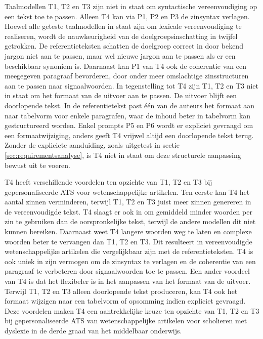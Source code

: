 Taalmodellen T1, T2 en T3 zijn niet in staat om syntactische vereenvoudiging op een tekst toe te passen. Alleen T4 kan via P1, P2 en P3 de zinsyntax verlagen. Hoewel alle geteste taalmodellen in staat zijn om lexicale vereenvoudiging te realiseren, wordt de nauwkeurigheid van de doelgroepsinschatting in twijfel getrokken. De referentieteksten schatten de doelgroep correct in door bekend jargon niet aan te passen, maar wel nieuwe jargon aan te passen als er een beschikbaar synoniem is.  Daarnaast kan P1 van T4 ook de coherentie van een meegegeven paragraaf bevorderen, door onder meer omslachtige zinsstructuren aan te passen naar signaalwoorden. In tegenstelling tot T4 zijn T1, T2 en T3 niet in staat om het formaat van de uitvoer aan te passen. De uitvoer blijft een doorlopende tekst. In de referentietekst past één van de auteurs het formaat aan naar tabelvorm voor enkele paragrafen, waar de inhoud beter in tabelvorm kan gestructureerd worden. Enkel prompts P5 en P6 wordt er expliciet gevraagd om een formaatwijziging, anders geeft T4 vrijwel altijd een doorlopende tekst terug. Zonder de expliciete aanduiding, zoals uitgetest in sectie \ref{sec:requirementsanalyse}, is T4 niet in staat om deze structurele aanpassing bewust uit te voeren. 

\medspace

T4 heeft verschillende voordelen ten opzichte van T1, T2 en T3 bij gepersonaliseerde ATS voor wetenschappelijke artikelen. Ten eerste kan T4 het aantal zinnen verminderen, terwijl T1, T2 en T3 juist meer zinnen genereren in de vereenvoudigde tekst. T4 slaagt er ook in om gemiddeld minder woorden per zin te gebruiken dan de oorspronkelijke tekst, terwijl de andere modellen dit niet kunnen bereiken. Daarnaast weet T4 langere woorden weg te laten en complexe woorden beter te vervangen dan T1, T2 en T3. Dit resulteert in vereenvoudigde wetenschappelijke artikelen die vergelijkbaar zijn met de referentieteksten. T4 is ook uniek in zijn vermogen om de zinsyntax te verlagen en de coherentie van een paragraaf te verbeteren door signaalwoorden toe te passen. Een ander voordeel van T4 is dat het flexibeler is in het aanpassen van het formaat van de uitvoer. Terwijl T1, T2 en T3 alleen doorlopende tekst produceren, kan T4 ook het formaat wijzigen naar een tabelvorm of opsomming indien expliciet gevraagd. Deze voordelen maken T4 een aantrekkelijke keuze ten opzichte van T1, T2 en T3 bij gepersonaliseerde ATS van wetenschappelijke artikelen voor scholieren met dyslexie in de derde graad van het middelbaar onderwijs.

